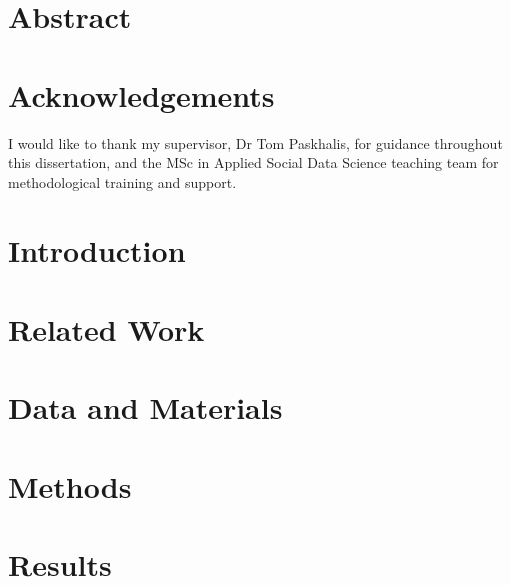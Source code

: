 \documentclass[a4paper,oneside,12pt]{book}
\begin{document}
\newpage

\chapter*{Abstract}
{}


\newpage
\chapter*{Acknowledgements}
{}
I would like to thank my supervisor, Dr Tom Paskhalis, for guidance throughout this dissertation, and the MSc in Applied Social Data Science teaching team for methodological training and support.

\newpage
\tableofcontents
\newpage
{}
{}
\listoffigures
\newpage
{}
{}
\listoftables
\newpage

\mainmatter
\onehalfspacing

\chapter{Introduction}


\chapter{Related Work}


\chapter{Data and Materials}


\chapter{Methods}


\chapter{Results}

\end{document}
